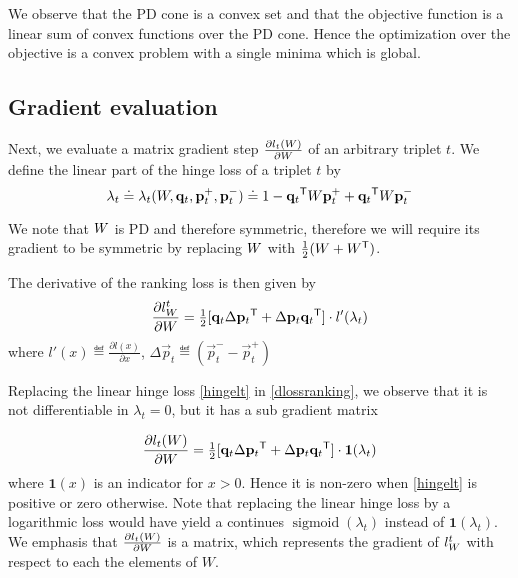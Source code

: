 \documentclass{article}
\begin{document}
We observe that the PD cone is a convex set and that the objective function is a linear sum of convex functions over the PD cone. Hence the optimization over the objective is a convex problem with a single minima which is global.

\subsection{Gradient evaluation}
Next, we evaluate a matrix gradient step  $\frac{\partial {l_t ({W})}}{\partial {W}}$ of an arbitrary triplet $t$. We define the linear part of the hinge loss of a triplet $t$ by
\begin{equation}
\lambda_t \doteq \lambda_t({W}, \mathbf{q}_t, \mathbf{p}_{t}^{+}, \mathbf{p}_{t}^{-}) \doteq 1-\mathbf{q}_{t}{}^\mathsf{T} {W} \mathbf{p}_{t}^{+}+\mathbf{q}_{t}{}^\mathsf{T}{W}\mathbf{p}_{t}^{-}
\end{equation}

We note that ${W}$ is PD and therefore symmetric, therefore we will require its gradient to be symmetric by replacing ${W}$ with $\tfrac{1}{2}({W} + {W}{}^\mathsf{T})$.

The derivative of the ranking loss is then given by
\begin{equation}
\frac{\partial {l_{{W}}^{t}}}{\partial {W}} = \tfrac{1}{2}[\mathbf{q}_{t}\Delta\mathbf{p}_{t}{}^\mathsf{T}  + \Delta\mathbf{p}_{t}\mathbf{q}_{t}{}^\mathsf{T}]\cdot {l'}(\lambda_t)
\label{dlossranking}
\end{equation} where $l'(x) \eqdef \frac{\partial {l(x)}}{\partial x}$, $\Delta\vec{p}_{t} \eqdef (\vec{p}_{t}^{-} - \vec{p}_{t}^{+})$

Replacing the linear hinge loss \eqref{hingelt} in \eqref{dlossranking}, we observe that it is not differentiable in $\lambda_t = 0$, but it has a sub gradient matrix

\begin{equation}
\frac{\partial {l_t ({W})}}{\partial {W}} = \tfrac{1}{2}[\mathbf{q}_{t}\Delta\mathbf{p}_{t}{}^\mathsf{T}  + \Delta\mathbf{p}_{t}\mathbf{q}_{t}{}^\mathsf{T}] \cdot \textbf{1}(\lambda_t)
\end{equation}
where $\textbf{1}(x)$ is an indicator for $x>0$. Hence it is non-zero when \eqref{hingelt} is positive or zero otherwise. Note that replacing the linear hinge loss by a logarithmic loss would have yield a continues $\operatorname{sigmoid}(\lambda_t)$ instead of $\textbf{1}(\lambda_t)$.  We emphasis that 
$\frac{\partial {l_t ({W})}}{\partial {W}}$ is a matrix, which represents the gradient of $l_{{W}}^{t}$ with respect to each the elements of $W$.
\end{document}
